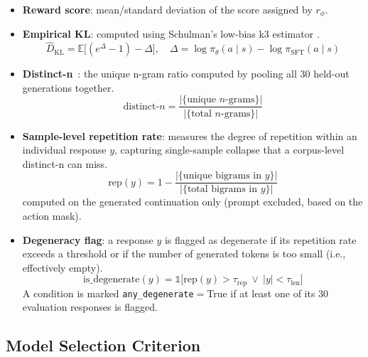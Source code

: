 \documentclass[conference]{IEEEtran}
\begin{document}
\begin{itemize}
  \item \textbf{Reward score}: mean/standard deviation of the score
        assigned by $r_\phi$.
  \item \textbf{Empirical KL}: computed using Schulman's low-bias k3
        estimator \cite{schulman2017ppo}.
        \begin{equation}
        \widehat{D}_{\mathrm{KL}} = \mathbb{E}\big[(e^{\Delta} - 1) -
        \Delta\big], \quad \Delta = \log\pi_\theta(a\mid s) -
        \log\pi_{\text{SFT}}(a\mid s)
        \label{eq:klhat}
        \end{equation}
  \item \textbf{Distinct-n}~\cite{li2016diversity}: the unique n-gram
        ratio computed by pooling all 30 held-out generations together.
        \begin{equation}
        \text{distinct-}n = \frac{|\{\text{unique } n\text{-grams}\}|}
        {|\{\text{total } n\text{-grams}\}|}
        \label{eq:distinctn}
        \end{equation}
  \item \textbf{Sample-level repetition rate}: measures the degree of
        repetition within an individual response $y$, capturing
        single-sample collapse that a corpus-level distinct-n can miss.
        \begin{equation}
        \text{rep}(y) = 1 - \frac{|\{\text{unique bigrams in } y\}|}
        {|\{\text{total bigrams in } y\}|}
        \label{eq:reprate}
        \end{equation}
        computed on the generated continuation only (prompt excluded,
        based on the action mask).
  \item \textbf{Degeneracy flag}: a response $y$ is flagged as
        degenerate if its repetition rate exceeds a threshold or if
        the number of generated tokens is too small (i.e., effectively
        empty).
        \begin{equation}
        \text{is\_degenerate}(y) = \mathbb{1}\big[\text{rep}(y) > \tau_{\text{rep}}
        \ \lor\ |y| < \tau_{\text{len}}\big]
        \label{eq:degenerate}
        \end{equation}
        A condition is marked \texttt{any\_degenerate}$=$True if at
        least one of its 30 evaluation responses is flagged.
\end{itemize}

\subsection{Model Selection Criterion}
\label{sec:selection}
\end{document}
